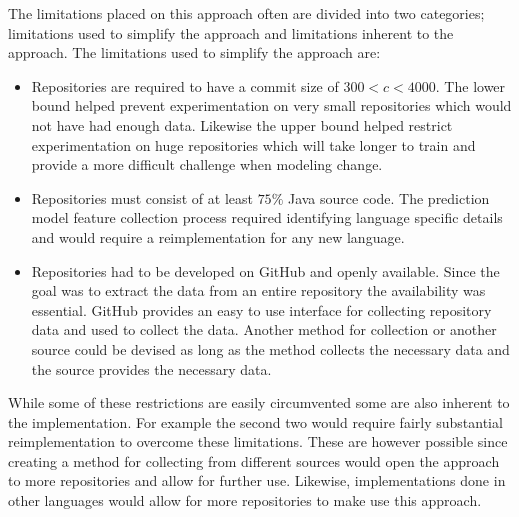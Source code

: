
The limitations placed on this approach often are divided into two categories; limitations used to simplify the approach and limitations inherent to the approach. The limitations used to simplify the approach are:
\begin{itemize}
\item Repositories are required to have a commit size of $300 < c < 4000$. The lower bound helped prevent experimentation on very small repositories which would not have had enough data. Likewise the upper bound helped restrict experimentation on huge repositories which will take longer to train and provide a more difficult challenge when modeling change.
\item Repositories must consist of at least $75\%$ Java source code. The prediction model feature collection process required identifying language specific details and would require a reimplementation for any new language.
\item Repositories had to be developed on GitHub and openly available. Since the goal was to extract the data from an entire repository the availability was essential. GitHub provides an easy to use interface for collecting repository data and used to collect the data. Another method for collection or another source could be devised as long as the method collects the necessary data and the source provides the necessary data.
\end{itemize}
While some of these restrictions are easily circumvented some are also inherent to the implementation. For example the second two would require fairly substantial reimplementation to overcome these limitations. These are however possible since creating a method for collecting from different sources would open the approach to more repositories and allow for further use. Likewise, implementations done in other languages would allow for more repositories to make use this approach.

